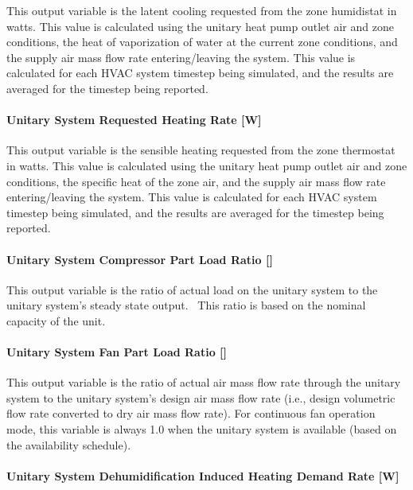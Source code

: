 This output variable is the latent cooling requested from the zone humidistat in watts. This value is calculated using the unitary heat pump outlet air and zone conditions, the heat of vaporization of water at the current zone conditions, and the supply air mass flow rate entering/leaving the system. This value is calculated for each HVAC system timestep being simulated, and the results are averaged for the timestep being reported.

\paragraph{Unitary System Requested Heating Rate {[}W{]}}\label{unitary-system-requested-heating-rate-w-1}

This output variable is the sensible heating requested from the zone thermostat in watts. This value is calculated using the unitary heat pump outlet air and zone conditions, the specific heat of the zone air, and the supply air mass flow rate entering/leaving the system. This value is calculated for each HVAC system timestep being simulated, and the results are averaged for the timestep being reported.

\paragraph{\texorpdfstring{Unitary System Compressor Part Load Ratio {[]}}{Unitary System Compressor Part Load Ratio }}\label{unitary-system-compressor-part-load-ratio-4}

This output variable is the ratio of actual load on the unitary system to the unitary system's steady state output.~ This ratio is based on the nominal capacity of the unit.

\paragraph{\texorpdfstring{Unitary System Fan Part Load Ratio {[]}}{Unitary System Fan Part Load Ratio }}\label{unitary-system-fan-part-load-ratio-7}

This output variable is the ratio of actual air mass flow rate through the unitary system to the unitary system's design air mass flow rate (i.e., design volumetric flow rate converted to dry air mass flow rate). For continuous fan operation mode, this variable is always 1.0 when the unitary system is available (based on the availability schedule).

\paragraph{Unitary System Dehumidification Induced Heating Demand Rate {[}W{]}}\label{unitary-system-dehumidification-induced-heating-demand-rate-w-1}

